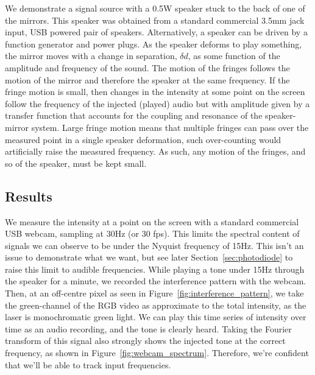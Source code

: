 \documentclass[prb,preprint]{revtex4-1}
\begin{document}
We demonstrate a signal source with a 0.5W speaker stuck to the back of one of the mirrors. This speaker was obtained from a standard commercial 3.5mm jack input, USB powered pair of speakers. Alternatively, a speaker can be driven by a function generator and power plugs.
As the speaker deforms to play something, the mirror moves with a change in separation, $\delta d$, as some function of the amplitude and frequency of the sound. The motion of the fringes follows the motion of the mirror and therefore the speaker at the same frequency. If the fringe motion is small, then changes in the intensity at some point on the screen follow the frequency of the injected (played) audio but with amplitude given by a transfer function that accounts for the coupling and resonance of the speaker-mirror system.
Large fringe motion means that multiple fringes can pass over the measured point in a single speaker deformation, such over-counting would artificially raise the measured frequency. As such, any motion of the fringes, and so of the speaker, must be kept small.


\subsection{Results}

We measure the intensity at a point on the screen with a standard commercial USB webcam, sampling at 30Hz (or 30 fps). This limits the spectral content of signals we can observe to be under the Nyquist frequency of 15Hz. This isn’t an issue to demonstrate what we want, but see later Section~\ref{sec:photodiode} to raise this limit to audible frequencies. While playing a tone under 15Hz through the speaker for a minute, we recorded the interference pattern with the webcam.
Then, at an off-centre pixel as seen in Figure~\ref{fig:interference_pattern}, we take the green-channel of the RGB video as approximate to the total intensity, as the laser is monochromatic green light. We can play this time series of intensity over time as an audio recording, and the tone is clearly heard. Taking the Fourier transform of this signal also strongly shows the injected tone at the correct frequency, as shown in Figure~\ref{fig:webcam_spectrum}. Therefore, we’re confident that we’ll be able to track input frequencies.
\end{document}
